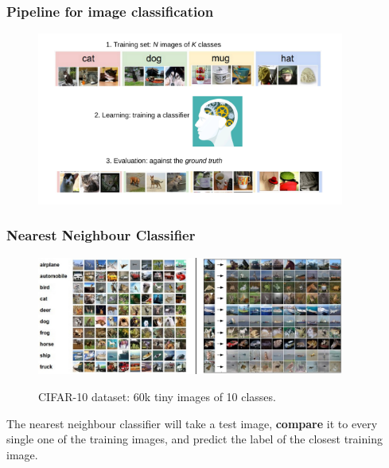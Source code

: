 \begin{frame}
	\frametitle{Pipeline for image classification}

	\centering
        \begin{figure}
                \includegraphics[width=0.9\textwidth]{Pics/pipeline.pdf}
        \end{figure}

\end{frame}

\begin{frame}
	\frametitle{Nearest Neighbour Classifier}

	\centering
        \begin{figure}
                \includegraphics[width=0.9\textwidth]{Pics/nn.jpg} \\
                \caption{CIFAR-10 dataset: 60k tiny images of 10 classes.}
        \end{figure}

	The nearest neighbour classifier will take a test image, \textbf{compare} it to every single one 
	of the training images, and predict the label of the closest training image.

\end{frame}

